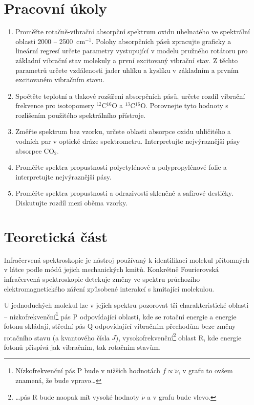 \documentclass[10pt,a4paper]{article}
\renewcommand{\U}[1]{\ensuremath{\,\mathrm{#1}}}
\newcommand{\°}{\degree}
\begin{document}


\section{Pracovní úkoly}
\begin{enumerate}
    \item Proměřte rotačně-vibrační absorpční spektrum oxidu uhelnatého ve spektrální oblasti 2000 – 2500 $\U{cm^{-1}}$. Polohy absorpčních pásů zpracujte graficky a lineární regresí určete parametry vystupující v modelu pružného rotátoru pro základní vibrační stav molekuly a první excitovaný vibrační stav. Z těchto parametrů určete vzdálenosti jader uhlíku a kyslíku v základním a prvním excitovaném vibračním stavu.
    \item Spočtěte teplotní a tlakové rozšíření absorpčních pásů, určete rozdíl vibrační frekvence pro isotopomery $^{12}$C$^{16}$O a $^{13}$C$^{16}$O. Porovnejte tyto hodnoty s rozlišením použitého spektrálního přístroje.
    \item Změřte spektrum bez vzorku, určete oblasti absorpce oxidu uhličitého a vodních par v optické dráze spektrometru. Interpretujte nejvýraznější pásy absorpce CO$_2$.
    \item Proměřte spektra propustnosti polyetylénové a polypropylénové folie a interpretujte nejvýraznější pásy.
    \item Proměřte spektra propustnosti a odrazivosti skleněné a safírové destičky. Diskutujte rozdíl mezi oběma vzorky.
\end{enumerate}


\section{Teoretická část}
Infračervená spektroskopie je nástroj používaný k identifikaci molekul přítomných v látce podle módů jejich mechanických kmitů. Konkrétně Fourierovská infračervená spektroskopie detekuje změny ve spektru průchozího elektromagnetického záření způsobené interakcí s kmitající molekulou.

U jednoduchých molekul lze v jejich spektru pozorovat tři charakteristické oblasti –
nízkofrekvenční\footnote{Nízkofrekvenční pás P bude v nižších hodnotách $f \propto \tilde{\nu}$, v grafu to ovšem znamená, že bude vpravo\dots} pás P odpovídající oblasti, kde se rotační energie a energie fotonu skládají, střední pás Q odpovídající vibračním přechodům beze změny rotačního stavu (a kvantového čísla $J$), vysokofrekvenční\footnote{\dots pás R bude naopak mít vysoké hodnoty $\tilde\nu$ a v grafu bude vlevo.} oblast R, kde energie fotonů přispívá jak vibračním, tak rotačním stavům. \cite{studijni-text}
\end{document}
